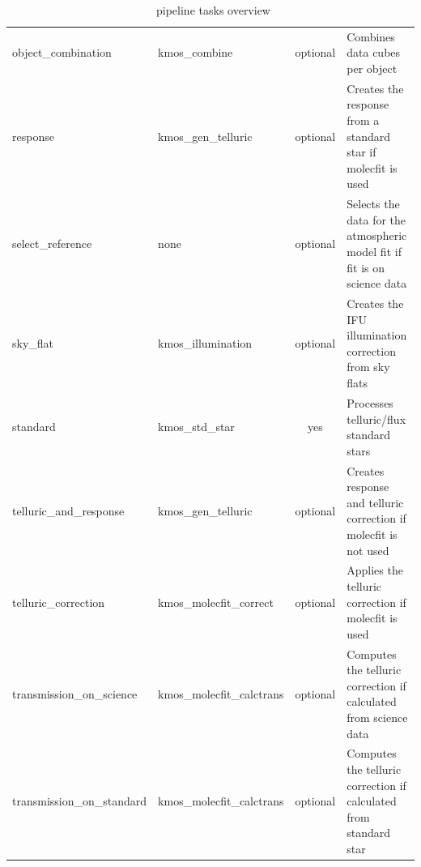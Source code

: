 \begin{table}[htbp]
\begin{tabular}{|l|l|c|p{7cm}|}
object\_combination       & kmos\_combine             & optional & Combines data cubes per object \\
response                  & kmos\_gen\_telluric       & optional & Creates the response from a standard star if molecfit is used \\
select\_reference         & none                      & optional & Selects the data for the atmospheric model fit if fit is on science data \\
sky\_flat                 & kmos\_illumination        & optional & Creates the IFU illumination correction from sky flats \\
standard                  & kmos\_std\_star           & yes      & Processes telluric/flux standard stars \\
telluric\_and\_response   & kmos\_gen\_telluric       & optional & Creates response and telluric correction if molecfit is not used \\
telluric\_correction      & kmos\_molecfit\_correct   & optional & Applies the telluric correction if molecfit is used \\
transmission\_on\_science & kmos\_molecfit\_calctrans & optional & Computes the telluric correction if calculated from science data \\
transmission\_on\_standard& kmos\_molecfit\_calctrans & optional & Computes the telluric correction if calculated from standard star \\
\hline
\end{tabular}
\caption{\instname\ pipeline tasks overview}
\end{table}
